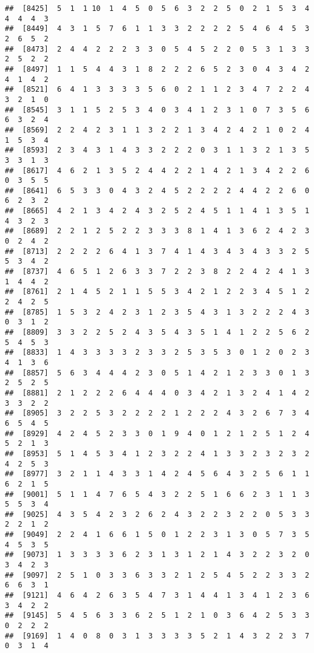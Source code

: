 \documentclass[
]{article}
\begin{document}
\begin{verbatim}
##  [8425]  5  1  1 10  1  4  5  0  5  6  3  2  2  5  0  2  1  5  3  4  4  4  4  3
##  [8449]  4  3  1  5  7  6  1  1  3  3  2  2  2  2  5  4  6  4  5  3  2  6  5  2
##  [8473]  2  4  4  2  2  2  3  3  0  5  4  5  2  2  0  5  3  1  3  3  2  5  2  2
##  [8497]  1  1  5  4  4  3  1  8  2  2  2  6  5  2  3  0  4  3  4  2  4  1  4  2
##  [8521]  6  4  1  3  3  3  3  5  6  0  2  1  1  2  3  4  7  2  2  4  3  2  1  0
##  [8545]  3  1  1  5  2  5  3  4  0  3  4  1  2  3  1  0  7  3  5  6  6  3  2  4
##  [8569]  2  2  4  2  3  1  1  3  2  2  1  3  4  2  4  2  1  0  2  4  1  5  3  4
##  [8593]  2  3  4  3  1  4  3  3  2  2  2  0  3  1  1  3  2  1  3  5  3  3  1  3
##  [8617]  4  6  2  1  3  5  2  4  4  2  2  1  4  2  1  3  4  2  2  6  0  3  5  5
##  [8641]  6  5  3  3  0  4  3  2  4  5  2  2  2  2  4  4  2  2  6  0  6  2  3  2
##  [8665]  4  2  1  3  4  2  4  3  2  5  2  4  5  1  1  4  1  3  5  1  4  3  2  3
##  [8689]  2  2  1  2  5  2  2  3  3  3  8  1  4  1  3  6  2  4  2  3  0  2  4  2
##  [8713]  2  2  2  2  6  4  1  3  7  4  1  4  3  4  3  4  3  3  2  5  5  3  4  2
##  [8737]  4  6  5  1  2  6  3  3  7  2  2  3  8  2  2  4  2  4  1  3  1  4  4  2
##  [8761]  2  1  4  5  2  1  1  5  5  3  4  2  1  2  2  3  4  5  1  2  2  4  2  5
##  [8785]  1  5  3  2  4  2  3  1  2  3  5  4  3  1  3  2  2  2  4  3  0  3  1  2
##  [8809]  3  3  2  2  5  2  4  3  5  4  3  5  1  4  1  2  2  5  6  2  5  4  5  3
##  [8833]  1  4  3  3  3  3  2  3  3  2  5  3  5  3  0  1  2  0  2  3  4  1  3  6
##  [8857]  5  6  3  4  4  4  2  3  0  5  1  4  2  1  2  3  3  0  1  3  2  5  2  5
##  [8881]  2  1  2  2  2  6  4  4  4  0  3  4  2  1  3  2  4  1  4  2  3  3  2  2
##  [8905]  3  2  2  5  3  2  2  2  2  1  2  2  2  4  3  2  6  7  3  4  6  5  4  5
##  [8929]  4  2  4  5  2  3  3  0  1  9  4  0  1  2  1  2  5  1  2  4  5  2  1  3
##  [8953]  5  1  4  5  3  4  1  2  3  2  2  4  1  3  3  2  3  2  3  2  4  2  5  3
##  [8977]  3  2  1  1  4  3  3  1  4  2  4  5  6  4  3  2  5  6  1  1  6  2  1  5
##  [9001]  5  1  1  4  7  6  5  4  3  2  2  5  1  6  6  2  3  1  1  3  5  5  3  4
##  [9025]  4  3  5  4  2  3  2  6  2  4  3  2  2  3  2  2  0  5  3  3  2  2  1  2
##  [9049]  2  2  4  1  6  6  1  5  0  1  2  2  3  1  3  0  5  7  3  5  4  5  3  5
##  [9073]  1  3  3  3  3  6  2  3  1  3  1  2  1  4  3  2  2  3  2  0  3  4  2  3
##  [9097]  2  5  1  0  3  3  6  3  3  2  1  2  5  4  5  2  2  3  3  2  6  6  3  1
##  [9121]  4  6  4  2  6  3  5  4  7  3  1  4  4  1  3  4  1  2  3  6  3  4  2  2
##  [9145]  5  4  5  6  3  3  6  2  5  1  2  1  0  3  6  4  2  5  3  3  0  2  2  2
##  [9169]  1  4  0  8  0  3  1  3  3  3  3  5  2  1  4  3  2  2  3  7  0  3  1  4

\end{verbatim}
\end{document}
